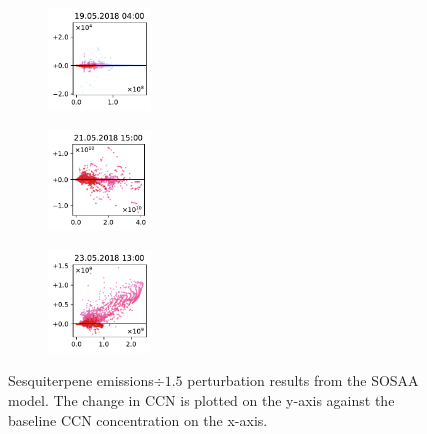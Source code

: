 \begin{figure}[H]
    \begin{subfigure}
        \centering
        \includegraphics[width=0.30\textwidth,valign=t]{evaluation/figures/perturbations/perturbation-19.05.2018:04.00-sesquiterpenes-div-1.5.pdf}
    \end{subfigure}
    \begin{subfigure}
        \centering
        \includegraphics[width=0.30\textwidth,valign=t]{evaluation/figures/perturbations/perturbation-21.05.2018:15.00-sesquiterpenes-div-1.5.pdf}
    \end{subfigure}
    \begin{subfigure}
        \centering
        \includegraphics[width=0.30\textwidth,valign=t]{evaluation/figures/perturbations/perturbation-23.05.2018:13.00-sesquiterpenes-div-1.5.pdf}
    \end{subfigure}
    
    \caption[Sesquiterpene emissions$\div 1.5$ perturbation SOSAA results]{Sesquiterpene emissions$\div 1.5$ perturbation results from the SOSAA model. The change in CCN is plotted on the y-axis against the baseline CCN concentration on the x-axis.}
    \label{fig:sosaa-perturbation-sesquiterpenes-div-1.5}
\end{figure}
